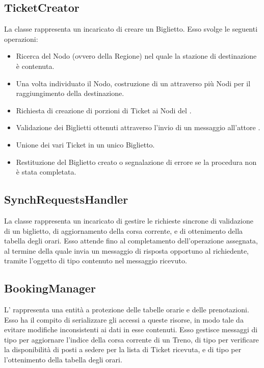 	\subsection{TicketCreator}
	
	La classe  rappresenta un  incaricato di creare un Biglietto. Esso svolge le seguenti operazioni:
	\begin{itemize}
		\item Ricerca del Nodo (ovvero della Regione) nel quale la stazione di destinazione è contenuta.
		\item Una volta individuato il Nodo, costruzione di un  attraverso più Nodi per il raggiungimento della destinazione.
		\item Richiesta di creazione di porzioni di Ticket ai Nodi del .
		\item Validazione dei Biglietti ottenuti attraverso l'invio di un messaggio all'attore .
		\item Unione dei vari Ticket in un unico Biglietto.
		\item Restituzione del Biglietto creato o segnalazione di errore se la procedura non è stata completata.
	\end{itemize}

	\subsection{SynchRequestsHandler}
	
	La classe  rappresenta un  incaricato di gestire le richieste sincrone di validazione di un biglietto, di aggiornamento della corsa corrente, e di ottenimento della tabella degli orari. Esso attende fino al completamento dell'operazione assegnata, al termine della quale invia un messaggio di risposta opportuno al richiedente, tramite l'oggetto di tipo  contenuto nel messaggio  ricevuto.	
	
	\subsection{BookingManager}
	
	L'  rappresenta una entità  a protezione delle tabelle orarie e delle prenotazioni. Esso ha il compito di serializzare gli accessi a queste risorse, in modo tale da evitare modifiche inconsistenti ai dati in esse contenuti.
	Esso gestisce messaggi di tipo  per aggiornare l'indice della corsa corrente di un Treno, di tipo  per verificare la disponibilità di posti a sedere per la lista di Ticket ricevuta, e di tipo  per l'ottenimento della tabella degli orari.
	
